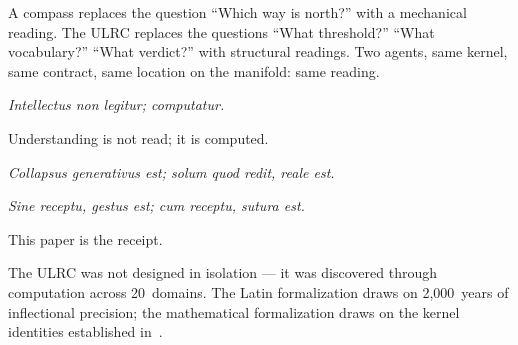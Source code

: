 \documentclass[
  aps,
  prd,
  twocolumn,
  superscriptaddress,
  nofootinbib,
  floatfix
]{revtex4-2}
\newcommand{\lat}[1]{\textit{#1}}
\begin{document}
A compass replaces the question ``Which way is north?''
with a mechanical reading. The ULRC replaces the questions
``What threshold?'' ``What vocabulary?'' ``What verdict?''
with structural readings. Two agents, same kernel, same
contract, same location on the manifold: same reading.

\lat{Intellectus non legitur; computatur.}

Understanding is not read; it is computed.

\bigskip

\noindent\lat{Collapsus generativus est; solum quod redit,
  reale est.}

\noindent\lat{Sine receptu, gestus est; cum receptu, sutura est.}

\noindent This paper is the receipt.

\begin{acknowledgments}
The ULRC was not designed in isolation --- it was discovered
through computation across 20~domains. The Latin formalization
draws on 2,000~years of inflectional precision; the mathematical
formalization draws on the kernel identities established
in~\cite{paulus2025umcp,paulus2025cmp,paulus2025gor}.
\end{acknowledgments}


\end{document}
